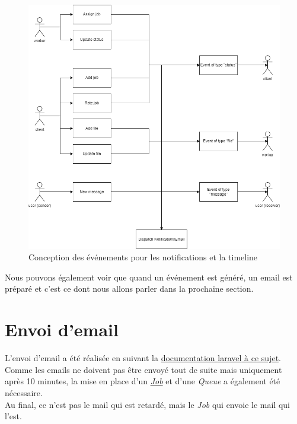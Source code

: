 \documentclass[
    iai, %
    il, %
]{heig-tb}
\begin{document}
\begin{center}
    \begin{figure}
        \includegraphics[width=\textwidth]{./assets/figures/events-email-scenario.drawio.png}
        \caption{Conception des événements pour les notifications et la timeline \label{events-email-scenario.drawio}}
    \end{figure}
\end{center}

Nous pouvons également voir que quand un événement est généré, un email est préparé et c'est ce dont nous allons parler dans la prochaine section.

\section{Envoi d'email}
L'envoi d'email a été réalisée en suivant la \href{https://laravel.com/docs/9.x/mail}{documentation \Gls{laravel} à ce sujet}. \\
Comme les emails ne doivent pas être envoyé tout de suite mais uniquement après 10 minutes, la mise en place d'un \href{https://laravel.com/docs/9.x/queues#creating-jobs}{\emph{Job}} et d'une \emph{Queue} a également été nécessaire. \\
Au final, ce n'est pas le mail qui est retardé, mais le \emph{Job} qui envoie le mail qui l'est.
\end{document}
